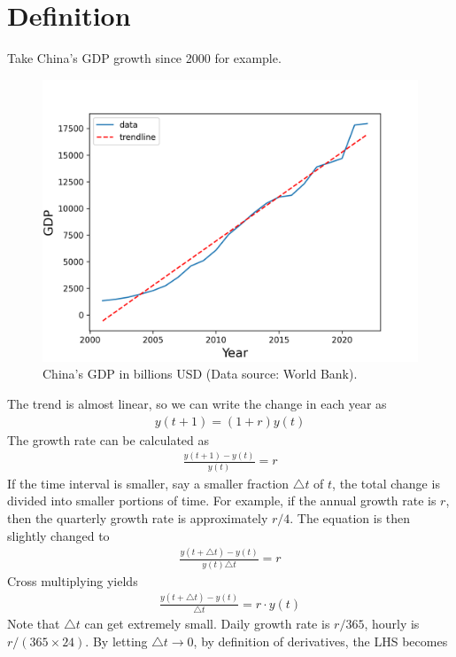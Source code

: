 \documentclass[11pt,a4paper]{book}
\theoremstyle{definition}\newtheorem{definition}{Definition}
\theoremstyle{definition}\newtheorem{fact}{Fact}
\theoremstyle{definition}\newtheorem{remark}{Remark}
\theoremstyle{definition}\newtheorem{ex}{Ex.}
\theoremstyle{definition}\newtheorem{project}{Project}
\theoremstyle{definition}\newtheorem{problem}{Problem}
\theoremstyle{definition}\newtheorem{example}{Example}
\numberwithin{theorem}{section}
\numberwithin{corollary}{chapter}
\numberwithin{assumption}{chapter}
\numberwithin{definition}{chapter}
\numberwithin{prop}{chapter}
\numberwithin{notation}{chapter}
\numberwithin{problem}{chapter}
\numberwithin{example}{chapter}
\numberwithin{fact}{chapter}
\numberwithin{ex}{chapter}
\begin{document}
	\section{Definition}
	Take China's GDP growth since 2000 for example. 
	\begin{figure}[ht]
		\centering
		\includegraphics[scale=0.5]{figs/china_gdp.png}
		\caption{China's GDP in billions USD (Data source: World Bank). }
	\end{figure}
	The trend is almost linear, so we can write the change in each year as
	\begin{align*}
		y(t+1) = (1 + r) y(t)	
	\end{align*} 
	The growth rate can be calculated as
	\begin{align*}
		\frac{y(t+1)-y(t)}{y(t)} = r
	\end{align*}
	If the time interval is smaller, say a smaller fraction $\triangle t$ of $t$, the total change is divided into smaller portions of time. For example, if the annual growth rate is $r$, then the quarterly growth rate is approximately $r/4$. The equation is then slightly changed to
	\begin{align*}
		\frac{y(t+\triangle t) - y(t)}{y(t) \triangle t }  = r
	\end{align*}
	Cross multiplying yields
	\begin{align*}
		\frac{y(t+\triangle t) - y(t)}{ \triangle t }  = r \cdot y(t)
	\end{align*}
	Note that $\triangle t$ can get extremely small. Daily growth rate is $r/365$, hourly is $r/(365\times 24)$. By letting $\triangle t \to 0$, by definition of derivatives, the LHS becomes
\end{document}
